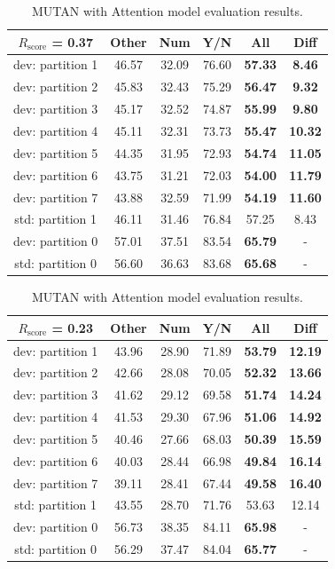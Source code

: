 \documentclass[letterpaper]{article}
\newcommand{\rscore}{}\def\rscore/{$R_{\text{score}}$}
\begin{document}
\begin{table}
\begin{subtable}{0.49\linewidth}
		\begin{tabular}{c | c c c c | c}
			\rscore/ = 0.37  & Other & Num   & Y/N   & All            & Diff           \\ [0.5ex]
			\hline
			dev: partition 1 & 46.57 & 32.09 & 76.60 & \textbf{57.33} & \textbf{8.46}  \\
			dev: partition 2 & 45.83 & 32.43 & 75.29 & \textbf{56.47} & \textbf{9.32}  \\
			dev: partition 3 & 45.17 & 32.52 & 74.87 & \textbf{55.99} & \textbf{9.80}  \\
			dev: partition 4 & 45.11 & 32.31 & 73.73 & \textbf{55.47} & \textbf{10.32} \\
			dev: partition 5 & 44.35 & 31.95 & 72.93 & \textbf{54.74} & \textbf{11.05} \\
			dev: partition 6 & 43.75 & 31.21 & 72.03 & \textbf{54.00} & \textbf{11.79} \\
			dev: partition 7 & 43.88 & 32.59 & 71.99 & \textbf{54.19} & \textbf{11.60} \\
			\hline
			std: partition 1 & 46.11 & 31.46 & 76.84 & 57.25          & 8.43           \\
			\hline
			dev: partition 0 & 57.01 & 37.51 & 83.54 & \textbf{65.79} & -              \\
			std: partition 0 & 56.60 & 36.63 & 83.68 & \textbf{65.68} & -              \\
			\hline
		\end{tabular}
		\caption{MLB with Attention model evaluation results.}
	\end{subtable}
	\begin{subtable}{0.49\linewidth}
		\begin{tabular}{c | c c c c | c}
			\rscore/ = 0.23  & Other & Num   & Y/N   & All            & Diff           \\ [0.5ex]
			\hline
			dev: partition 1 & 43.96 & 28.90 & 71.89 & \textbf{53.79} & \textbf{12.19} \\
			dev: partition 2 & 42.66 & 28.08 & 70.05 & \textbf{52.32} & \textbf{13.66} \\
			dev: partition 3 & 41.62 & 29.12 & 69.58 & \textbf{51.74} & \textbf{14.24} \\
			dev: partition 4 & 41.53 & 29.30 & 67.96 & \textbf{51.06} & \textbf{14.92} \\
			dev: partition 5 & 40.46 & 27.66 & 68.03 & \textbf{50.39} & \textbf{15.59} \\
			dev: partition 6 & 40.03 & 28.44 & 66.98 & \textbf{49.84} & \textbf{16.14} \\
			dev: partition 7 & 39.11 & 28.41 & 67.44 & \textbf{49.58} & \textbf{16.40} \\
			\hline
			std: partition 1 & 43.55 & 28.70 & 71.76 & 53.63          & 12.14          \\
			\hline
			dev: partition 0 & 56.73 & 38.35 & 84.11 & \textbf{65.98} & -              \\
			std: partition 0 & 56.29 & 37.47 & 84.04 & \textbf{65.77} & -              \\
			\hline
		\end{tabular}
		\caption{MUTAN with Attention model evaluation results.}


\end{subtable}
\end{table}
\end{document}
